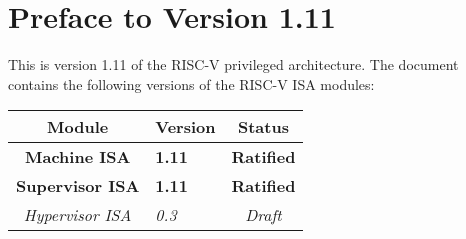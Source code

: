 \section*{Preface to Version 1.11}

This is version 1.11 of the RISC-V privileged architecture.
The document contains the following versions of the RISC-V ISA
modules:

{
\begin{table}[hbt]
  \centering
  \begin{tabular}{|c|l|c|}
    \hline
    Module             & Version  & Status\\
    \hline
    \bf Machine ISA    & \bf 1.11 & \bf Ratified \\
    \bf Supervisor ISA & \bf 1.11 & \bf Ratified \\
    \em Hypervisor ISA & \em 0.3  & \em Draft \\
    \hline
  \end{tabular}
\end{table}
}

